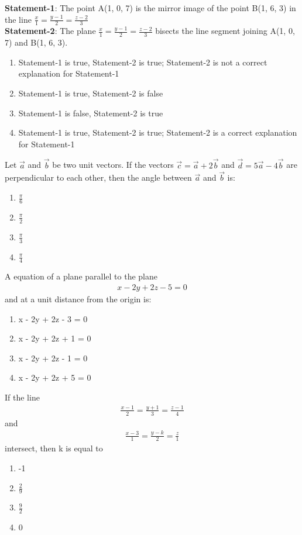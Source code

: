 \item \textbf{Statement-1}: The point A(1, 0, 7) is the mirror image of the point B(1, 6, 3) in the line $\frac{x}{1} = \frac{y-1}{2} = \frac{z-2}{3}$\\
\textbf{Statement-2}: The plane $\frac{x}{1} = \frac{y-1}{2} = \frac{z-2}{3}$ bisects the line segment joining A(1, 0, 7) and B(1, 6, 3).
\begin{enumerate}
\item Statement-1 is true, Statement-2 is true; Statement-2 is not a correct explanation for Statement-1
\item Statement-1 is true, Statement-2 is false
\item Statement-1 is false, Statement-2 is true
\item Statement-1 is true, Statement-2 is true; Statement-2 is a correct explanation for Statement-1
\end{enumerate}

\item Let $\overrightarrow{a}$ and $\overrightarrow{b}$ be two unit vectors. If the vectors $\overrightarrow{c}=\overrightarrow{a}+2\overrightarrow{b}$ and $\overrightarrow{d}=5\overrightarrow{a}-4\overrightarrow{b}$ are perpendicular to each other, then the angle between $\overrightarrow{a}$ and $\overrightarrow{b}$ is:
\begin{enumerate}
\item $\frac{\pi}{6}$
\item $\frac{\pi}{2}$
\item $\frac{\pi}{3}$
\item $\frac{\pi}{4}$
\end{enumerate}

\item A equation of a plane parallel to the plane 
\begin{align}
x - 2y + 2z - 5 = 0
\end{align}
and at a unit distance from the origin is:
\begin{enumerate}
\item x - 2y + 2z - 3 = 0
\item x - 2y + 2z + 1 = 0
\item x - 2y + 2z - 1 = 0
\item x - 2y + 2z + 5 = 0
\end{enumerate}

\item If the line 
\begin{align*}
\frac{x-1}{2} = \frac{y+1}{3} = \frac{z-1}{4}
\end{align*}
and 
\begin{align*}
\frac{x-3}{1} = \frac{y-k}{2} = \frac{z}{1}
\end{align*}
intersect, then k is equal to
\begin{enumerate}
\item -1
\item $\frac{2}{9}$
\item $\frac{9}{2}$
\item 0
\end{enumerate}

